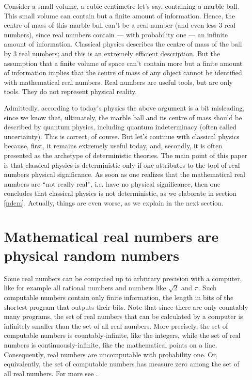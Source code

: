 \documentclass[floatfix,12pt]{article}
\begin{document}
Consider a small volume, a cubic centimetre let's say, containing a marble ball. This small volume can contain but a finite amount of information. Hence, the centre of mass of this marble ball can't be a real number (and even less 3 real numbers), since real numbers contain --- with probability one --- an infinite amount of information. Classical physics describes the centre of mass of the ball by 3 real numbers; and this is an extremely efficient description. But the assumption that a finite volume of space can't contain more but a finite amount of information implies that the centre of mass of any object cannot be identified with mathematical real numbers. Real numbers are useful tools, but are only tools. They do not represent physical reality. 

Admittedly, according to today's physics the above argument is a bit misleading, since we know that, ultimately, the marble ball and its centre of mass should be described by quantum physics, including quantum indeterminacy (often called uncertainty). This is correct, of course. But let's continue with classical physics because, first, it remains extremely useful today, and, secondly, it is often presented as the archetype of deterministic theories. The main point of this paper is that classical physics is deterministic only if one attributes to the tool of real numbers physical significance. As soon as one realizes that the mathematical real numbers are ``not really real'', i.e. have no physical significance, then one concludes that classical physics is not deterministic, as we elaborate in section \ref{ndcm}. Actually, things are even worse, as we explain in the next section.



\section{Mathematical real numbers are physical random numbers}\label{randomNb}
Some real numbers can be computed up to arbitrary precision with a computer, like for example all rational numbers and numbers like $\sqrt{2}$ and $\pi$. Such computable numbers contain only finite information, the length in bits of the shortest program that outputs their bits. Note that since there are only countably many programs, the set of real numbers that can be calculated by a computer is infinitely smaller than the set of all real numbers. More precisely, the set of computable numbers is countably-infinite, like the integers, while the set of real numbers is continuously-infinite, like the mathematical points on a line. Consequently, real numbers are uncomputable with probability one. Or, equivalently, the set of computable numbers has measure zero among the set of all real numbers. For more see \cite{Chaitin}.
\end{document}
